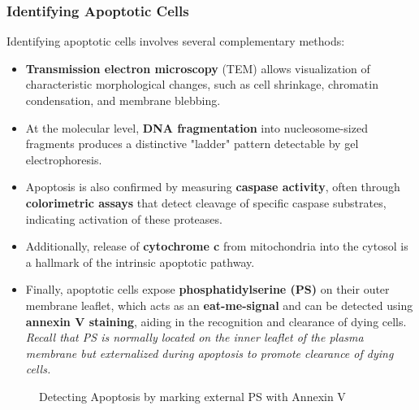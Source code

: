 \documentclass[../main.tex]{subfiles}
\begin{document}
\subsubsection{Identifying Apoptotic Cells}
Identifying apoptotic cells involves several complementary methods:
\begin{itemize}
	\item \textbf{Transmission electron microscopy} (TEM) allows visualization of characteristic morphological changes, such as cell shrinkage, chromatin condensation, and membrane blebbing.
	
	\item  At the molecular level, \textbf{DNA fragmentation} into nucleosome-sized fragments produces a distinctive "ladder" pattern detectable by gel electrophoresis.
	
	\item  Apoptosis is also confirmed by measuring \textbf{caspase activity}, often through \textbf{colorimetric assays} that detect cleavage of specific caspase substrates, indicating activation of these proteases.
	
	\item Additionally, release of \textbf{cytochrome c} from mitochondria into the cytosol is a hallmark of the intrinsic apoptotic pathway.
	
	\item  Finally, apoptotic cells expose \textbf{phosphatidylserine (PS)} on their outer membrane leaflet, which acts as an \textbf{\gls{eat-me-signal}} and can be detected using \textbf{annexin V staining}, aiding in the recognition and clearance of dying cells. \textit{Recall that PS is normally located on the inner leaflet of the plasma membrane but externalized during apoptosis to promote clearance of dying cells.}
\end{itemize}

\begin{figure}[H]
	\centering
	\caption{Detecting Apoptosis by marking external PS with Annexin V}
\end{figure}

\printglossaries

	
\end{document}
